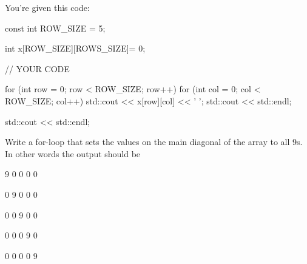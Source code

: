 \begin{ex}
You're given this code:

\begin{consolethree}
const int ROW_SIZE = 5;

int x[ROW_SIZE][ROWS_SIZE]= {{0}};

// YOUR CODE

for (int row = 0; row < ROW_SIZE; row++)
{
     for (int col = 0; col < ROW_SIZE; col++)
     {
       std::cout << x[row][col]  << ' ';
     }
     std::cout << std::endl;
}

std::cout << std::endl; 
\end{consolethree}

Write a for-loop that sets the values on the main diagonal of the array
to all 9s. In other words the output should be

\begin{consolethree}
9 0 0 0 0

0 9 0 0 0

0 0 9 0 0

0 0 0 9 0

0 0 0 0 9 
\end{consolethree}
\end{ex}
